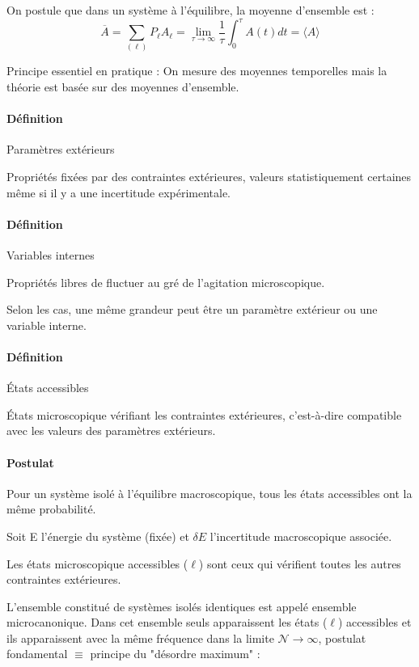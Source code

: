 \documentclass[12pt,a4paper]{report}
\begin{document}
On postule que dans un système à l'équilibre, la moyenne d'ensemble est :
\[
	\overline{A} = \sum_{(\ell)} P_\ell A_\ell = \underset{\tau \rightarrow \infty}{\lim} \dfrac{1}{\tau} \int_0^\tau A(t) dt = \langle A \rangle
\]

Principe essentiel en pratique : On mesure des moyennes temporelles mais la théorie est basée sur des moyennes d'ensemble.

\paragraph{Définition} Paramètres extérieurs

Propriétés fixées par des contraintes extérieures, valeurs statistiquement certaines même si il y a une incertitude expérimentale.

\paragraph{Définition} Variables internes

Propriétés libres de fluctuer au gré de l'agitation microscopique.

Selon les cas, une même grandeur peut être un paramètre extérieur ou une variable interne.

\paragraph{Définition} États accessibles

États microscopique vérifiant les contraintes extérieures, c'est-à-dire compatible avec les valeurs des paramètres extérieurs.

\paragraph{Postulat}

Pour un système isolé à l'équilibre macroscopique, tous les états accessibles ont la même probabilité.

Soit E l'énergie du système (fixée) et \(\delta E\) l'incertitude macroscopique associée.

Les états microscopique accessibles (\(\ell\)) sont ceux qui vérifient toutes les autres contraintes extérieures.

L'ensemble constitué de systèmes isolés identiques est appelé ensemble microcanonique. Dans cet ensemble seuls apparaissent les états (\(\ell\)) accessibles et ils apparaissent avec la même fréquence dans la limite \(\mathcal{N} \rightarrow \infty\), postulat fondamental \(\equiv\) principe du "désordre maximum" :
\end{document}
